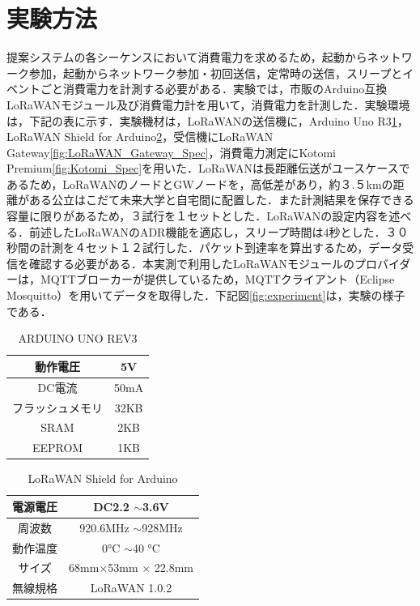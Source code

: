 \section{実験方法}
提案システムの各シーケンスにおいて消費電力を求めるため，起動からネットワーク参加，起動からネットワーク参加・初回送信，定常時の送信，スリープとイベントごと消費電力を計測する必要がある．実験では，市販のArduino互換LoRaWANモジュール及び消費電力計を用いて，消費電力を計測した．実験環境は，下記の表に示す．実験機材は，LoRaWANの送信機に，Arduino Uno R3\ref{fig:Arduino_Spec}，LoRaWAN Shield for Arduino\ref{fig:LoRaWAN_Spec}，受信機にLoRaWAN Gateway\ref{fig:LoRaWAN_Gateway_Spec}，消費電力測定にKotomi Premium\ref{fig:Kotomi_Spec}を用いた．LoRaWANは長距離伝送がユースケースであるため，LoRaWANのノードとGWノードを，高低差があり，約３.５kmの距離がある公立はこだて未来大学と自宅間に配置した．また計測結果を保存できる容量に限りがあるため，３試行を１セットとした．LoRaWANの設定内容を述べる．前述したLoRaWANのADR機能を適応し，スリープ時間は4秒とした．３０秒間の計測を４セット１２試行した．パケット到達率を算出するため，データ受信を確認する必要がある．本実測で利用したLoRaWANモジュールのプロバイダーは，MQTTブローカーが提供しているため，MQTTクライアント（Eclipse Mosquitto）を用いてデータを取得した．下記図\ref{fig:experiment}は，実験の様子である．

\begin{table}[]
    \caption{ARDUINO UNO REV3}\label{fig:Arduino_Spec}
    \centering
    \begin{tabular}{|c|c|}
    \hline
    動作電圧     & 5V   \\ \hline
    DC電流     & 50mA \\ \hline
    フラッシュメモリ & 32KB \\ \hline
    SRAM     & 2KB  \\ \hline
    EEPROM   & 1KB  \\ \hline
    \end{tabular}
\end{table}

\begin{table}[]
    \caption{LoRaWAN Shield for Arduino}\label{fig:LoRaWAN_Spec}
    \centering
    \begin{tabular}{|c|c|}
    \hline
    電源電圧 & DC2.2 $\sim$3.6V      \\ \hline
    周波数  & 920.6MHz $\sim$928MHz \\ \hline
    動作温度 & 0°C $\sim$40 °C       \\ \hline
    サイズ  & 68mm×53mm × 22.8mm    \\ \hline
    無線規格 & LoRaWAN 1.0.2         \\ \hline
    \end{tabular}
\end{table}

